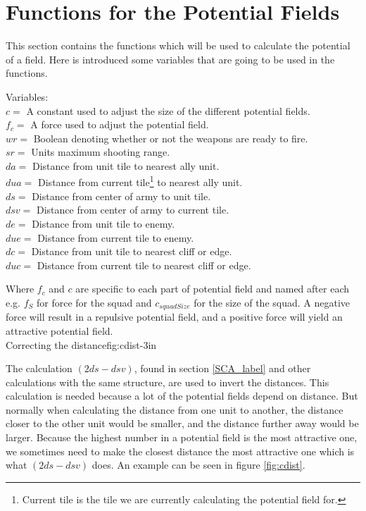 \section{Functions for the Potential Fields}
	This section contains the functions which will be used to calculate the potential of a field. Here is introduced some variables that 
	are going to be used in the functions.
	
	\label{cha3_variables}
	Variables:\\
	$c =$ A constant used to adjust the size of the different potential fields.\\ 
	$f_c =$ A force used to adjust the potential field.\\
	$wr =$ Boolean denoting whether or not the weapons are ready to fire.\\
	$sr =$ Units maximum shooting range.\\
	$da =$ Distance from unit tile to nearest ally unit.\\
	$dua =$ Distance from current tile\footnote{Current tile is the tile we are currently calculating the potential field for.} to nearest ally unit.\\
	$ds =$ Distance from center of army to unit tile.\\
	$dsv =$ Distance from center of army to current tile.\\
	$de =$ Distance from unit tile to enemy.\\
	$due =$ Distance from current tile to enemy.\\
	$dc =$ Distance from unit tile to nearest cliff or edge. \\
	$duc =$ Distance from current tile to nearest cliff or edge. 
	
	
	
	Where $f_c$ and $c$ are specific to each part of potential field and named after each e.g. $f_{S}$ for force for the squad and $c_{squadSize}$ for the size of the squad. A negative force will result in a repulsive potential field, and a positive force will yield an attractive potential field.\\
	
		    {Correcting the distance}{fig:cdist}{-3in}
			
	The calculation $(2ds - dsv)$, found in section \ref{SCA_label} and other calculations with the same structure, are used to invert the distances. This calculation is needed because a lot of the potential fields depend on distance. But normally when calculating the distance from one unit to another, the distance closer to the other unit would be smaller, and the distance further away would be larger. Because the highest number in a potential field is the most attractive one, we sometimes need to make the closest distance the most attractive one which is what $(2ds - dsv)$ does. An example can be seen in figure \ref{fig:cdist}.
	\pagebreak
